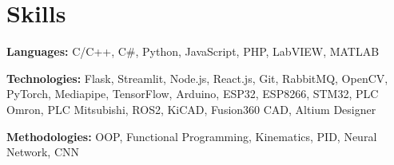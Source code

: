 \documentclass[letterpaper,11pt]{article}
\newcommand{\resumeSubHeadingListStart}{\begin{itemize}[leftmargin=0.15in, label={}]}
\newcommand{\resumeSubHeadingListEnd}{\end{itemize}}
\begin{document}
\section{Skills}
  \vspace{2pt}
  \resumeSubHeadingListStart
    \small{\item{
        
        \textbf{Languages:}{ C/C++, C\#, Python, JavaScript, PHP, LabVIEW, MATLAB} \\ \vspace{3pt}
        
        \textbf{Technologies:}{ Flask, Streamlit, Node.js, React.js, Git, RabbitMQ, OpenCV, PyTorch, Mediapipe, TensorFlow, Arduino, ESP32, ESP8266, STM32, PLC Omron, PLC Mitsubishi, ROS2, KiCAD, Fusion360 CAD, Altium Designer} \\ \vspace{3pt}
        
        \textbf{Methodologies:} {OOP, Functional Programming, Kinematics, PID, Neural Network, CNN} \\ \vspace{3pt}
        
    }}
  \resumeSubHeadingListEnd




\end{document}
